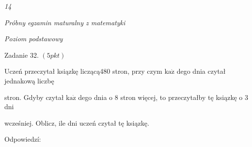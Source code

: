 \documentclass[a4paper,12pt]{article}
\begin{document}
{\it 14}

{\it Próbny egzamin maturalny z matematyki}

{\it Poziom podstawowy}

Zadanie 32. $(5pkt)$

Uczeń przeczytał ksiązkę liczącą480 stron, przy czym $\mathrm{k}\mathrm{a}\dot{\mathrm{z}}$ dego dnia czytał jednakową liczbę

stron. Gdyby czytał $\mathrm{k}\mathrm{a}\dot{\mathrm{z}}$ dego dnia o 8 stron więcej, to przeczytałby tę ksiązkę o 3 dni

wcześniej. Oblicz, ile dni uczeń czytał tę ksiązkę.

Odpowiedzí:
\end{document}
